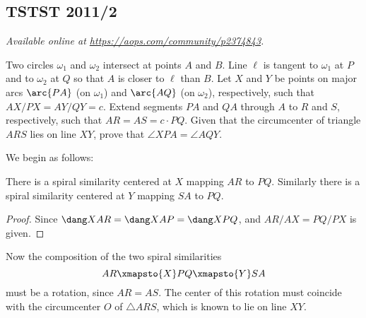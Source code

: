 \documentclass[11pt]{scrartcl}
\begin{document}
\subsection{TSTST 2011/2}
\textsl{Available online at \url{https://aops.com/community/p2374843}.}
\begin{mdframed}[style=mdpurplebox,frametitle={Problem statement}]
Two circles $\omega_1$ and $\omega_2$ intersect at points $A$ and $B$.
Line $\ell$ is tangent to $\omega_1$ at $P$
and to $\omega_2$ at $Q$ so that $A$ is closer to $\ell$ than $B$.
Let $X$ and $Y$ be points on major arcs $\arc{PA}$
(on $\omega_1$) and $\arc{AQ}$ (on $\omega_2$), respectively,
such that $AX/PX = AY/QY = c$.
Extend segments $PA$ and $QA$ through $A$ to $R$ and $S$,
respectively, such that $AR = AS = c\cdot PQ$.
Given that the circumcenter of triangle $ARS$ lies on line $XY$,
prove that $\angle XPA = \angle AQY$.
\end{mdframed}
We begin as follows:
\begin{claim*}
  There is a spiral similarity centered at $X$ mapping $AR$ to $PQ$.
  Similarly there is a spiral similarity centered at $Y$ mapping $SA$ to $PQ$.
\end{claim*}
\begin{proof}
  Since $\dang XAR = \dang XAP = \dang XPQ$,
  and $AR/AX = PQ/PX$ is given.
\end{proof}
Now the composition of the two spiral similarities
\[ AR \xmapsto{X} PQ \xmapsto{Y} SA \]
must be a rotation, since $AR = AS$.
The center of this rotation must coincide with the circumcenter $O$ of $\triangle ARS$,
which is known to lie on line $XY$.
\end{document}
